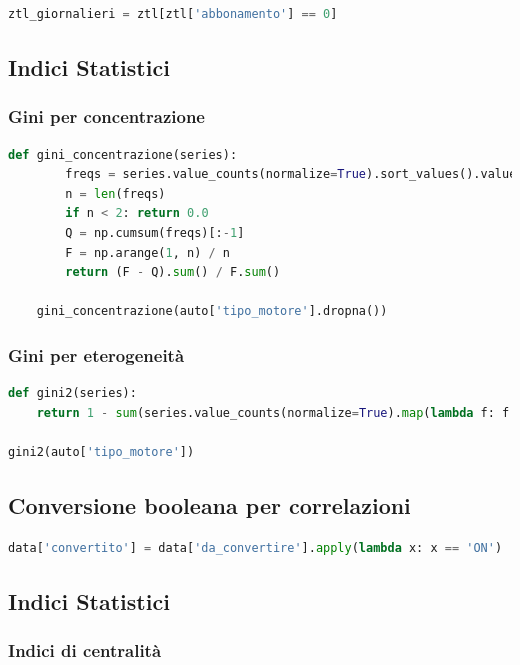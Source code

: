 \documentclass{article}
\begin{document}
\begin{lstlisting}[language=Python]
    ztl_giornalieri = ztl[ztl['abbonamento'] == 0]
\end{lstlisting}

\subsection*{Indici Statistici}

\subsubsection*{Gini per concentrazione}
\begin{lstlisting}[language=Python]
    def gini_concentrazione(series):
        freqs = series.value_counts(normalize=True).sort_values().values
        n = len(freqs)
        if n < 2: return 0.0
        Q = np.cumsum(freqs)[:-1]
        F = np.arange(1, n) / n
        return (F - Q).sum() / F.sum()

    gini_concentrazione(auto['tipo_motore'].dropna())
\end{lstlisting}

\subsubsection*{Gini per eterogeneità}
\begin{lstlisting}[language=Python]
def gini2(series):
    return 1 - sum(series.value_counts(normalize=True).map(lambda f: f ** 2))

gini2(auto['tipo_motore'])
\end{lstlisting}

\subsection*{Conversione booleana per correlazioni}

\begin{lstlisting}[language=Python]
data['convertito'] = data['da_convertire'].apply(lambda x: x == 'ON')
\end{lstlisting}

\subsection*{Indici Statistici}

\subsubsection*{Indici di centralità}
\end{document}
